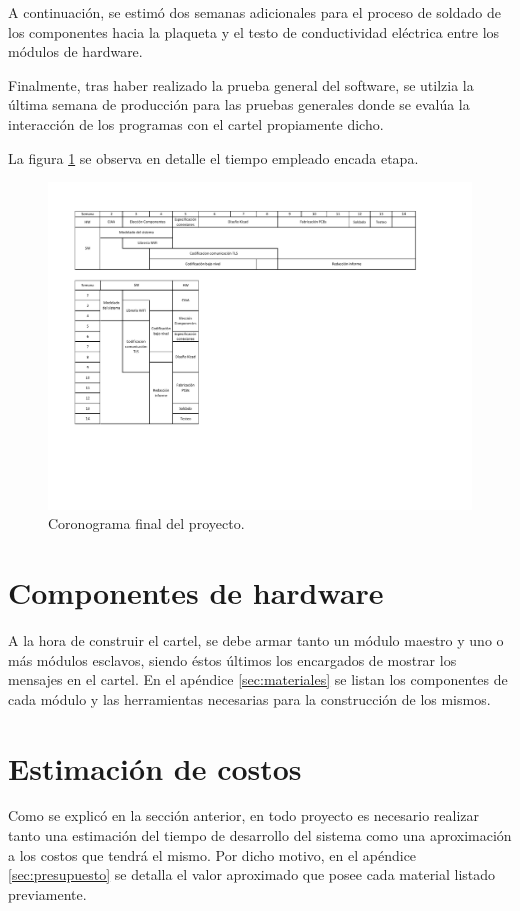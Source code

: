A continuación, se estimó dos semanas adicionales para el proceso de soldado de los componentes hacia la plaqueta y el testo de conductividad eléctrica entre los módulos de hardware.

Finalmente, tras haber realizado la prueba general del software, se utilzia la última semana de producción para las pruebas generales donde se evalúa la interacción de los programas con el cartel propiamente dicho.

La figura \ref{fig:cronograma} se observa en detalle el tiempo empleado encada etapa.

\begin{figure}[ht!]
	\begin{center}
		\centering
		\includegraphics[scale=1.4]{tablas/cronograma.pdf}
		\caption{Coronograma final del proyecto.}
		\label{fig:cronograma}
	\end{center}
\end{figure}

\section{Componentes de hardware}
A la hora de construir el cartel, se debe armar tanto un módulo maestro y uno o más módulos esclavos, siendo éstos últimos los encargados de mostrar los mensajes en el cartel.
En el apéndice \ref{sec:materiales} se listan los componentes de cada módulo y las herramientas necesarias para la construcción de los mismos.


\section{Estimación de costos}
Como se explicó en la sección anterior, en todo proyecto es necesario realizar tanto una estimación del tiempo de desarrollo del sistema como una aproximación a los costos que tendrá el mismo.
Por dicho motivo, en el apéndice \ref{sec:presupuesto} se detalla el valor aproximado que posee cada material listado previamente.